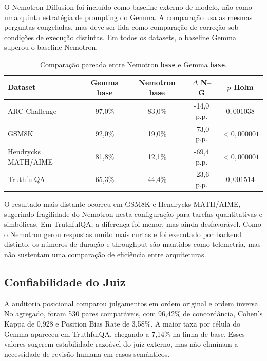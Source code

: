 \documentclass[12pt]{article}
\begin{document}
O Nemotron Diffusion foi incluído como baseline externo de modelo, não como uma quinta estratégia de prompting do Gemma. A comparação usa as mesmas perguntas congeladas, mas deve ser lida como comparação de correção sob condições de execução distintas. Em todos os datasets, o baseline Gemma superou o baseline Nemotron.

\begin{table}[ht]
\centering
\scriptsize
\setlength{\tabcolsep}{4pt}
\renewcommand{\arraystretch}{1.15}
\caption{Comparação pareada entre Nemotron \texttt{base} e Gemma \texttt{base}.}
\label{tab:nemotron-final}
\begin{tabular}{|p{3.6cm}|c|c|c|c|}
\hline
\textbf{Dataset} & \textbf{Gemma base} & \textbf{Nemotron base} & \textbf{\(\Delta\) N--G} & \textbf{\(p\) Holm} \\
\hline
ARC-Challenge & 97,0\% & 83,0\% & -14,0 p.p. & \(0{,}001038\) \\
GSM8K & 92,0\% & 19,0\% & -73,0 p.p. & \(<0{,}000001\) \\
Hendrycks MATH/AIME & 81,8\% & 12,1\% & -69,4 p.p. & \(<0{,}000001\) \\
TruthfulQA & 65,3\% & 44,4\% & -23,6 p.p. & \(0{,}001514\) \\
\hline
\end{tabular}
\end{table}

O resultado mais distante ocorreu em GSM8K e Hendrycks MATH/AIME, sugerindo fragilidade do Nemotron nesta configuração para tarefas quantitativas e simbólicas. Em TruthfulQA, a diferença foi menor, mas ainda desfavorável. Como o Nemotron gerou respostas muito mais curtas e foi executado por backend distinto, os números de duração e throughput são mantidos como telemetria, mas não sustentam uma comparação de eficiência entre arquiteturas.

\subsection{Confiabilidade do Juiz}

A auditoria posicional comparou julgamentos em ordem original e ordem inversa. No agregado, foram 530 pares comparáveis, com 96,42\% de concordância, Cohen's Kappa de 0,928 e Position Bias Rate de 3,58\%. A maior taxa por célula do Gemma apareceu em TruthfulQA, chegando a 7,14\% na linha de base. Esses valores sugerem estabilidade razoável do juiz externo, mas não eliminam a necessidade de revisão humana em casos semânticos.
\end{document}
